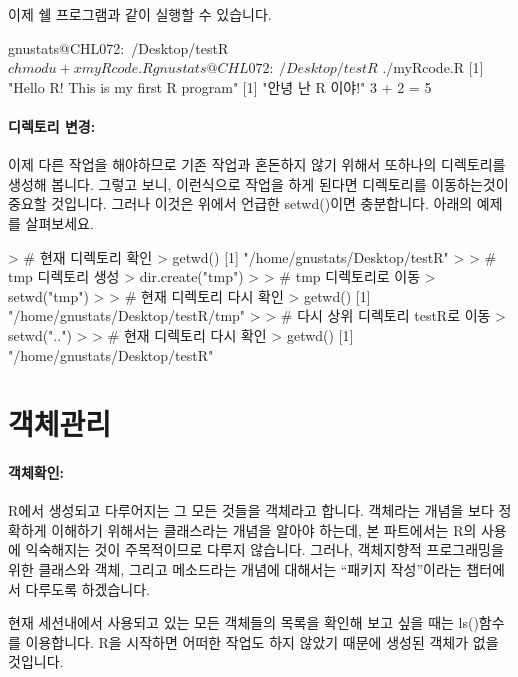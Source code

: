 \documentclass[tutorial.tex]{subfiles}
\begin{document}
이제 쉘 프로그램과 같이 실행할 수 있습니다. 
\begin{Schunk}
\begin{Soutput}
gnustats@CHL072:~/Desktop/testR$ chmod u+x myRcode.R
gnustats@CHL072:~/Desktop/testR$ ./myRcode.R
[1] "Hello R!  This is my first R program"
[1] "안녕 난 R 이야!"
3 + 2 = 5 
\end{Soutput}
\end{Schunk}

\paragraph{디렉토리 변경:}
이제 다른 작업을 해야하므로 기존 작업과 혼돈하지 않기 위해서 또하나의 디렉토리를 생성해 봅니다. 
그렇고 보니, 이런식으로 작업을 하게 된다면 디렉토리를 이동하는것이 중요할 것입니다. 
그러나 이것은 위에서 언급한 setwd()이면 충분합니다. 
아래의 예제를 살펴보세요.

\begin{Schunk}
\begin{Soutput}
> # 현재 디렉토리 확인 
> getwd()
[1] "/home/gnustats/Desktop/testR"
> 
> # tmp 디렉토리 생성 
> dir.create("tmp")
>
> # tmp 디렉토리로 이동 
> setwd("tmp")
> 
> # 현재 디렉토리 다시 확인 
> getwd()
[1] "/home/gnustats/Desktop/testR/tmp"
> 
> # 다시 상위 디렉토리 testR로 이동 
> setwd("..")
>
> # 현재 디렉토리 다시 확인 
> getwd()
[1] "/home/gnustats/Desktop/testR"
\end{Soutput}
\end{Schunk}


\section{객체관리}

\paragraph{객체확인: } R에서 생성되고 다루어지는 그 모든 것들을 객체라고 합니다. 
객체라는 개념을 보다 정확하게 이해하기 위해서는 클래스라는 개념을 알아야 하는데, 본 파트에서는 R의 사용에 익숙해지는 것이 주목적이므로 다루지 않습니다.
그러나, 객체지향적 프로그래밍을 위한 클래스와 객체, 그리고 메소드라는 개념에 대해서는 ``패키지 작성''이라는 챕터에서 다루도록 하겠습니다. 

현재 세션내에서 사용되고 있는 모든 객체들의 목록을 확인해 보고 싶을 때는 ls()함수를 이용합니다. 
R을 시작하면 어떠한 작업도 하지 않았기 때문에 생성된 객체가 없을 것입니다. 
\end{document}
